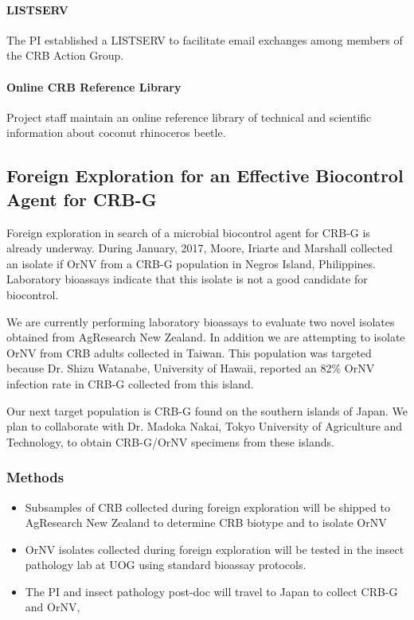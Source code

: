 \documentclass[12pt,letterpaper,english,bibliography=totocnumbered,abstract=on]{scrartcl}
\begin{document}
\paragraph{LISTSERV}
The PI established a LISTSERV to facilitate email exchanges among members of the CRB Action Group.\cite{mooreOnlineEmailDiscussion2021}

\paragraph{Online CRB Reference Library}
Project staff maintain an online reference library of technical and scientific information about coconut rhinoceros beetle.\cite{mooreOnlineReferenceLibrary2021}


\newpage
\begin{framed}
\subsection{Foreign Exploration for an Effective Biocontrol Agent for CRB-G}

Foreign exploration in search of a microbial biocontrol agent for CRB-G is already underway. During January, 2017, Moore, Iriarte and Marshall collected an isolate if OrNV from a CRB-G population in Negros Island, Philippines. Laboratory bioassays indicate that this isolate is not a good candidate for biocontrol.

We are currently performing laboratory bioassays to evaluate two novel isolates obtained from AgResearch New Zealand. In addition we are attempting to isolate OrNV from CRB adults collected in Taiwan. This population was targeted because Dr. Shizu Watanabe, University of Hawaii, reported an 82\% OrNV infection rate in CRB-G collected from this island.

Our next target population is CRB-G found on the southern islands of Japan. We plan to collaborate with Dr. Madoka Nakai, Tokyo University of Agriculture and Technology, to obtain CRB-G/OrNV specimens from these islands.

\subsubsection{Methods}

\begin{itemize}
	\item Subsamples of CRB collected during foreign exploration will be shipped to AgResearch New Zealand to determine CRB biotype and to isolate OrNV
	\item OrNV isolates collected during foreign exploration will be tested in the insect pathology lab at UOG using standard bioassay protocols.
	\item The PI and insect pathology post-doc will travel to Japan to collect CRB-G and OrNV, 
\end{itemize}
\end{framed}
\end{document}
